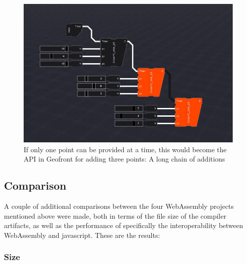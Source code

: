 \begin{figure}
  \graphicspath{{../../assets/images/6.1.2/}}
  \centering
  \includegraphics[width=0.50\linewidth]{chain-API.PNG}
  \caption[]{If only one point can be provided at a time, this would become the API in Geofront for adding three points: A long chain of additions}
  \label{fig:chain-api}
\end{figure}




\subsection{Comparison}

A couple of additional comparisons between the four WebAssembly projects mentioned above were made, both in terms of the file size of the compiler artifacts, as well as the performance of specifically the interoperability between WebAssembly and javascript. 
These are the results:

\subsubsection*{Size}

